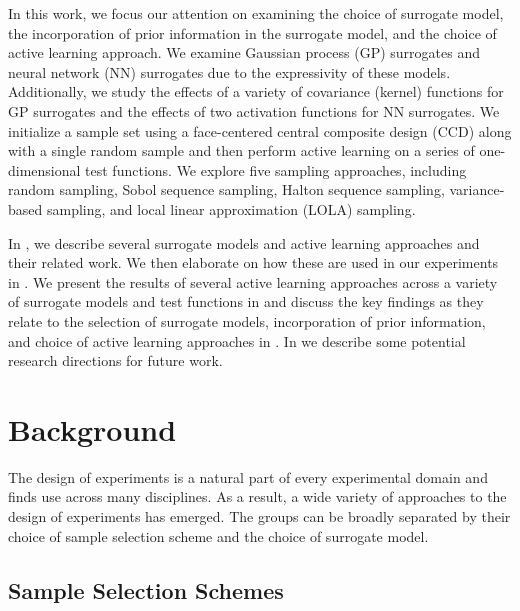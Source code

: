 \documentclass[conference]{IEEEtran}
\begin{document}
	In this work, we focus our attention on examining the choice of surrogate model, the incorporation of prior information in the surrogate model, and the choice of active learning approach. We examine Gaussian process (GP) surrogates and neural network (NN) surrogates due to the expressivity of these models. Additionally, we study the effects of a variety of covariance (kernel) functions for GP surrogates and the effects of two activation functions for NN surrogates. We initialize a sample set using a face-centered central composite design (CCD) along with a single random sample and then perform active learning on a series of one-dimensional test functions. We explore five sampling approaches, including random sampling, Sobol sequence sampling, Halton sequence sampling, variance-based sampling, and local linear approximation (LOLA) sampling.
	
    In , we describe several surrogate models and active learning approaches and their related work. We then elaborate on how these are used in our experiments in . We present the results of several active learning approaches across a variety of surrogate models and test functions in  and discuss the key findings as they relate to the selection of surrogate models, incorporation of prior information, and choice of active learning approaches in . In  we describe some potential research directions for future work.
	
	\section{Background}
	\label{sec:background}
	
	The design of experiments is a natural part of every experimental domain and finds use across many disciplines. As a result, a wide variety of approaches to the design of experiments has emerged. The groups can be broadly separated by their choice of sample selection scheme and the choice of surrogate model.
	
	\subsection{Sample Selection Schemes}
	
\end{document}
